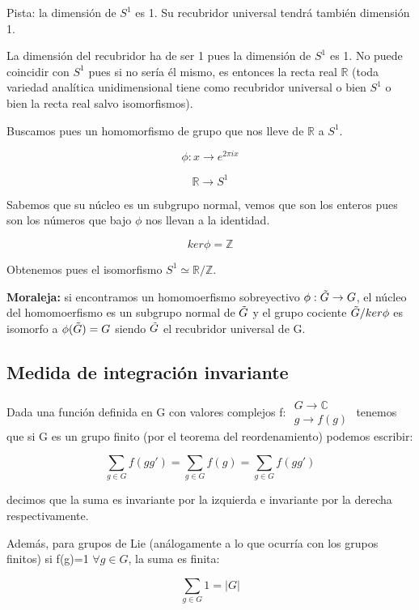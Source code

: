 \documentclass{article}
\begin{document}
     Pista: la dimensión de $S^1$ es 1. Su recubridor universal tendrá también dimensión 1.


     \smallskip
     La dimensión del recubridor ha de ser 1 pues la dimensión de $S^1$ es 1. No puede coincidir con $S^1$ pues si no sería él mismo, es entonces la recta real $\mathds{R}$ (toda variedad analítica unidimensional tiene como recubridor universal o bien $S^1$ o bien la recta real salvo isomorfismos).

     \smallskip
     Buscamos pues un homomorfismo de grupo que nos lleve de $\mathds{R}$ a $S^1$.

     $$\phi: x \to e^{2\pi i x}$$

     $$\mathds{R} \to S^1$$

     Sabemos que su núcleo es un subgrupo normal, vemos que son los enteros pues son los números que bajo $\phi$ nos llevan a la identidad.

     $$ker \phi = \mathds{Z}$$

     Obtenemos pues el isomorfismo $S^1 \simeq \mathds{R} / \mathds{Z}$.

     \textbf{Moraleja:} si encontramos un homomoerfismo sobreyectivo $\phi: \Tilde{G} \to G$, el núcleo del homomoerfismo es un subgrupo normal de $\Tilde{G}$ y el grupo cociente $\Tilde{G}/ker\phi$ es isomorfo a $\phi (\Tilde{G})=G$ siendo $\Tilde{ G}$ el recubridor universal de G.


     \subsection{Medida de integración invariante}

     Dada una función definida en G con valores complejos f: $\begin{array}{c}
         G \to \mathds{C}  \\
          g \to f(g)
     \end{array}$ tenemos que si G es un grupo finito (por el teorema del reordenamiento) podemos escribir:

     $$\sum _{g\in G} f(gg')=\sum _{g\in G} f(g)=\sum _{g\in G} f(gg')$$

     decimos que la suma es invariante por la izquierda e invariante por la derecha respectivamente.

     \smallskip
     Además, para grupos de Lie (análogamente a lo que ocurría con los grupos finitos) si f(g)=1 $\forall g \in G$, la suma es finita:

     $$\sum _{g \in G} 1 =|G|$$
\end{document}
